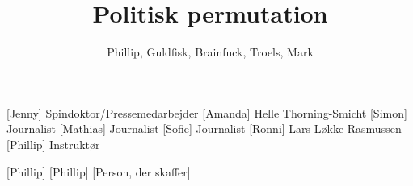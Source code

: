 \documentclass[a4paper,11pt]{article}
\title{Politisk permutation}
\author{Phillip, Guldfisk, Brainfuck, Troels, Mark}
\begin{document}
\maketitle

\begin{roles}
[Jenny] Spindoktor/Pressemedarbejder
[Amanda] Helle Thorning-Smicht
[Simon] Journalist
[Mathias] Journalist
[Sofie] Journalist
[Ronni] Lars Løkke Rasmussen
[Phillip] Instruktør
\end{roles}

\begin{props}
[Phillip]
[Phillip]
[Person, der skaffer]
\end{props}
\end{document}
